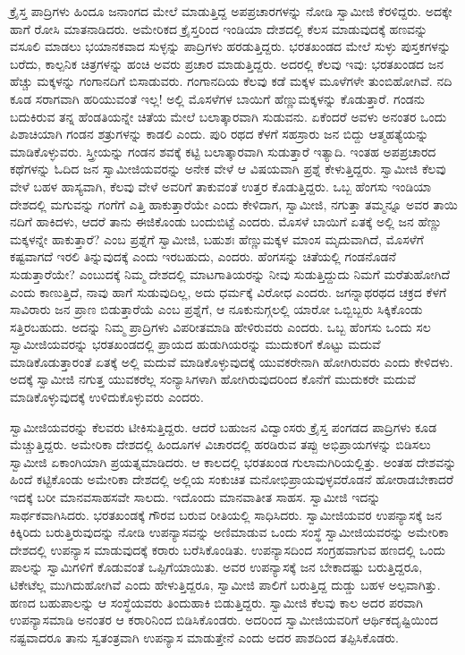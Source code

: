  ಕ್ರೈಸ್ತ ಪಾದ್ರಿಗಳು ಹಿಂದೂ ಜನಾಂಗದ ಮೇಲೆ ಮಾಡುತ್ತಿದ್ದ ಅಪಪ್ರಚಾರಗಳನ್ನು ನೋಡಿ ಸ್ವಾಮೀಜಿ ಕೆರಳಿದ್ದರು. ಅದಕ್ಕೇ ಹಾಗೆ ರೋಸಿ ಮಾತನಾಡಿದರು. ಅಮೇರಿಕದ ಕ್ರೈಸ್ತರಿಂದ ಇಂಡಿಯಾ ದೇಶದಲ್ಲಿ ಕೆಲಸ ಮಾಡುವುದಕ್ಕೆ ಹಣವನ್ನು ವಸೂಲಿ ಮಾಡಲು ಭಯಾನಕವಾದ ಸುಳ್ಳನ್ನು ಪಾದ್ರಿಗಳು ಹರಡುತ್ತಿದ್ದರು. ಭರತಖಂಡದ ಮೇಲೆ ಸುಳ್ಳು ಪುಸ್ತಕಗಳನ್ನು ಬರೆದು, ಕಾಲ್ಪನಿಕ ಚಿತ್ರಗಳನ್ನು ಹಂಚಿ ಅವರು ಪ್ರಚಾರ ಮಾಡುತ್ತಿದ್ದರು. ಅದರಲ್ಲಿ ಕೆಲವು ಇವು: ಭರತಖಂಡದ ಜನ ಹೆಚ್ಚು ಮಕ್ಕಳನ್ನು ಗಂಗಾನದಿಗೆ ಬಿಸಾಡುವರು. ಗಂಗಾನದಿಯ ಕೆಲವು ಕಡೆ ಮಕ್ಕಳ ಮೂಳೆಗಳೇ ತುಂಬಿಹೋಗಿವೆ. ನದಿ ಕೂಡ ಸರಾಗವಾಗಿ ಹರಿಯುವಂತೆ ಇಲ್ಲ! ಅಲ್ಲಿ ಮೊಸಳೆಗಳ ಬಾಯಿಗೆ ಹೆಣ್ಣುಮಕ್ಕಳನ್ನು ಕೊಡುತ್ತಾರೆ. ಗಂಡನು ಬದುಕಿರುವ ತನ್ನ ಹೆಂಡತಿಯನ್ನೇ ಚಿತೆಯ ಮೇಲೆ ಬಲಾತ್ಕಾರವಾಗಿ ಸುಡುವನು. ಏಕೆಂದರೆ ಅವಳು ಅನಂತರ ಒಂದು ಪಿಶಾಚಿಯಾಗಿ ಗಂಡನ ಶತ್ರುಗಳನ್ನು ಕಾಡಲಿ ಎಂದು. ಪುರಿ ರಥದ ಕೆಳಗೆ ಸಹಸ್ರಾರು ಜನ ಬಿದ್ದು ಆತ್ಮಹತ್ಯೆಯನ್ನು ಮಾಡಿಕೊಳ್ಳುವರು. ಸ್ತ್ರೀಯನ್ನು ಗಂಡನ ಶವಕ್ಕೆ ಕಟ್ಟಿ ಬಲಾತ್ಕಾರವಾಗಿ ಸುಡುತ್ತಾರೆ ಇತ್ಯಾದಿ. ಇಂತಹ ಅಪಪ್ರಚಾರದ ಕಥೆಗಳನ್ನು ಓದಿದ ಜನ ಸ್ವಾಮೀಜಿಯವರನ್ನು ಅನೇಕ ವೇಳೆ ಆ ವಿಷಯವಾಗಿ ಪ್ರಶ್ನೆ ಕೇಳುತ್ತಿದ್ದರು. ಸ್ವಾಮೀಜಿ ಕೆಲವು ವೇಳೆ ಬಹಳ ಹಾಸ್ಯವಾಗಿ, ಕೆಲವು ವೇಳೆ ಅವರಿಗೆ ತಾಕುವಂತೆ ಉತ್ತರ ಕೊಡುತ್ತಿದ್ದರು. ಒಬ್ಬ ಹೆಂಗಸು ಇಂಡಿಯಾ ದೇಶದಲ್ಲಿ ಮಗುವನ್ನು ಗಂಗೆಗೆ ಎತ್ತಿ ಹಾಕುತ್ತಾರೆಯೇ ಎಂದು ಕೇಳಿದಾಗ, ಸ್ವಾಮೀಜಿ, ನಗುತ್ತಾ ತಮ್ಮನ್ನೂ ಅವರ ತಾಯಿ ನದಿಗೆ ಹಾಕಿದಳು, ಆದರೆ ತಾನು ಈಜಿಕೊಂಡು ಬಂದುಬಿಟ್ಟೆ ಎಂದರು. ಮೊಸಳೆ ಬಾಯಿಗೆ ಏತಕ್ಕೆ ಅಲ್ಲಿ ಜನ ಹೆಣ್ಣು ಮಕ್ಕಳನ್ನೇ ಹಾಕುತ್ತಾರೆ? ಎಂಬ ಪ್ರಶ್ನೆಗೆ ಸ್ವಾಮೀಜಿ, ಬಹುಶಃ ಹೆಣ್ಣುಮಕ್ಕಳ ಮಾಂಸ ಮೃದುವಾಗಿದೆ, ಮೊಸಳೆಗೆ ಕಷ್ಟವಾಗದೆ ಇರಲಿ ತಿನ್ನುವುದಕ್ಕೆ ಎಂದು ಇರಬಹುದು, ಎಂದರು. ಹೆಂಗಸನ್ನು ಚಿತೆಯಲ್ಲಿ ಗಂಡನೊಡನೆ ಸುಡುತ್ತಾರೆಯೇ? ಎಂಬುದಕ್ಕೆ ನಿಮ್ಮ ದೇಶದಲ್ಲಿ ಮಾಟಗಾತಿಯರನ್ನು ನೀವು ಸುಡುತ್ತಿದ್ದುದು ನಿಮಗೆ ಮರೆತುಹೋಗಿದೆ ಎಂದು ಕಾಣುತ್ತಿದೆ, ನಾವು ಹಾಗೆ ಸುಡುವುದಿಲ್ಲ, ಅದು ಧರ್ಮಕ್ಕೆ ವಿರೋಧ ಎಂದರು. ಜಗನ್ನಾಥರಥದ ಚಕ್ರದ ಕೆಳಗೆ ಸಾವಿರಾರು ಜನ ಪ್ರಾಣ ಬಿಡುತ್ತಾರೆಯೆ ಎಂಬ ಪ್ರಶ್ನೆಗೆ, ಆ ನೂಕುನುಗ್ಗಲಲ್ಲಿ ಯಾರೋ ಒಬ್ಬಿಬ್ಬರು ಸಿಕ್ಕಿಕೊಂಡು ಸತ್ತಿರಬಹುದು. ಅದನ್ನು ನಿಮ್ಮ ಪ್ರಾದ್ರಿಗಳು ವಿಪರೀತಮಾಡಿ ಹೇಳಿರುವರು ಎಂದರು. ಒಬ್ಬ ಹೆಂಗಸು ಒಂದು ಸಲ ಸ್ವಾಮೀಜಿಯವರನ್ನು ಭರತಖಂಡದಲ್ಲಿ ಪ್ರಾಯದ ಹುಡುಗಿಯರನ್ನು ಮುದುಕರಿಗೆ ಕೊಟ್ಟು ಮದುವೆ ಮಾಡಿಕೊಡುತ್ತಾರಂತೆ ಏತಕ್ಕೆ ಅಲ್ಲಿ ಮದುವೆ ಮಾಡಿಕೊಳ್ಳುವುದಕ್ಕೆ ಯುವಕರೇನಾಗಿ ಹೋಗಿರುವರು ಎಂದು ಕೇಳಿದಳು. ಅದಕ್ಕೆ ಸ್ವಾಮೀಜಿ ನಗುತ್ತ ಯುವಕರೆಲ್ಲ ಸಂನ್ಯಾಸಿಗಳಾಗಿ ಹೋಗಿರುವುದರಿಂದ ಕೊನೆಗೆ ಮುದುಕರೇ ಮದುವೆ ಮಾಡಿಕೊಳ್ಳುವುದಕ್ಕೆ ಉಳಿದುಕೊಳ್ಳುವರು ಎಂದರು. 

 ಸ್ವಾಮೀಜಿಯವರನ್ನು ಕೆಲವರು ಟೀಕಿಸುತ್ತಿದ್ದರು. ಆದರೆ ಬಹುಜನ ವಿದ್ವಾಂಸರು ಕ್ರೈಸ್ತ ಪಂಗಡದ ಪಾದ್ರಿಗಳು ಕೂಡ ಮೆಚ್ಚುತ್ತಿದ್ದರು. ಅಮೇರಿಕಾ ದೇಶದಲ್ಲಿ ಹಿಂದೂಗಳ ವಿಚಾರದಲ್ಲಿ ಹರಡಿರುವ ತಪ್ಪು ಅಭಿಪ್ರಾಯಗಳನ್ನು ಬಿಡಿಸಲು ಸ್ವಾಮೀಜಿ ಏಕಾಂಗಿಯಾಗಿ ಪ್ರಯತ್ನಮಾಡಿದರು. ಆ ಕಾಲದಲ್ಲಿ ಭರತಖಂಡ ಗುಲಾಮಗಿರಿಯಲ್ಲಿತ್ತು. ಅಂತಹ ದೇಶವನ್ನು ಹಿಂದೆ ಕಟ್ಟಿಕೊಂಡು ಅಮೇರಿಕಾ ದೇಶದಲ್ಲಿ ಅಲ್ಲಿಯ ಸಂಕುಚಿತ ಮನೋಭಿಪ್ರಾಯವುಳ್ಳವರೊಡನೆ ಹೋರಾಡಬೇಕಾದರೆ ಇದಕ್ಕೆ ಬರೀ ಮಾನವ\break ಸಾಹಸವೇ ಸಾಲದು. ಇದೊಂದು ಮಾನವಾತೀತ ಸಾಹಸ. ಸ್ವಾಮೀಜಿ ಇದನ್ನು ಸಾರ್ಥಕವಾಗಿಸಿದರು. ಭರತಖಂಡಕ್ಕೆ ಗೌರವ ಬರುವ ರೀತಿಯಲ್ಲಿ ಸಾಧಿಸಿದರು. ಸ್ವಾಮೀಜಿಯವರ ಉಪನ್ಯಾಸಕ್ಕೆ ಜನ ಕಿಕ್ಕಿರಿದು ಬರುತ್ತಿರುವುದನ್ನು ನೋಡಿ ಉಪನ್ಯಾಸವನ್ನು ಅಣಿಮಾಡುವ ಒಂದು ಸಂಸ್ಥೆ ಸ್ವಾಮೀಜಿಯವರನ್ನು ಅಮೇರಿಕಾ ದೇಶದಲ್ಲಿ ಉಪನ್ಯಾಸ ಮಾಡುವುದಕ್ಕೆ ಕರಾರು ಬರೆಸಿಕೊಂಡಿತು. ಉಪನ್ಯಾಸದಿಂದ ಸಂಗ್ರಹವಾಗುವ ಹಣದಲ್ಲಿ ಒಂದು ಪಾಲನ್ನು ಸ್ವಾಮಿಗಳಿಗೆ ಕೊಡುವಂತೆ ಒಪ್ಪಿಗೆಯಾಯಿತು. ಅವರ ಉಪನ್ಯಾಸಕ್ಕೆ ಜನ ಬೇಕಾದಷ್ಟು ಬರುತ್ತಿದ್ದರೂ, ಟಿಕೇಟೆಲ್ಲ ಮುಗಿದುಹೋಗಿವೆ ಎಂದು ಹೇಳುತ್ತಿದ್ದರೂ, ಸ್ವಾಮೀಜಿ ಪಾಲಿಗೆ ಬರುತ್ತಿದ್ದ ದುಡ್ಡು ಬಹಳ ಅಲ್ಪವಾಗಿತ್ತು. ಹಣದ ಬಹುಪಾಲನ್ನು ಆ ಸಂಸ್ಥೆಯವರು ತಿಂದುಹಾಕಿ ಬಿಡುತ್ತಿದ್ದರು. ಸ್ವಾಮೀಜಿ ಕೆಲವು ಕಾಲ ಅದರ ಪರವಾಗಿ ಉಪನ್ಯಾಸಮಾಡಿ ಅನಂತರ ಆ ಕರಾರಿನಿಂದ ಬಿಡಿಸಿಕೊಂಡರು. ಅದರಿಂದ ಸ್ವಾಮೀಜಿಯವರಿಗೆ ಆರ್ಥಿಕದೃಷ್ಟಿಯಿಂದ ನಷ್ಟವಾದರೂ ತಾನು ಸ್ವತಂತ್ರವಾಗಿ ಉಪನ್ಯಾಸ ಮಾಡುತ್ತೇನೆ ಎಂದು ಅದರ ಪಾಶದಿಂದ ತಪ್ಪಿಸಿಕೊಡರು. 

